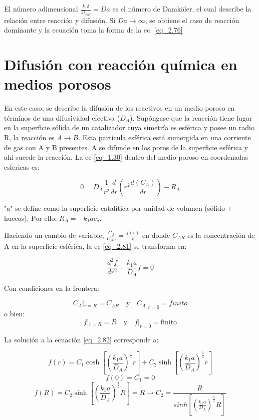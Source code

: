 El número adimensional $\frac{k_1\delta}{\mathscr{D}_{AB}}=Da$ es el número de Damköler, el cual describe la relación entre reacción y difusión. Si $Da\rightarrow\infty$, se obtiene el caso de reacción dominante y la ecuación toma la forma de la ec. \eqref{eq_2.76}

\section{Difusión con reacción química en medios porosos}

En este caso, se describe la difusión de los reactivos en un medio poroso en términos de una difusividad efectiva ($D_A$). Supóngase que la reacción tiene lugar en la superficie sólida de un catalizador cuya simetría es esférica y posee un radio R, la reacción es $A\rightarrow B$. Esta partícula esférica está sumergida en una corriente de gas con A y B presentes. A se difunde en los poros de la superficie esférica y ahí sucede la reacción. La ec \eqref{eq_1.30} dentro del medio poroso en coordenadas esfericas es:

\begin{equation}
    0=D_A\frac{1}{r^2}\frac{d}{dr}(r^2\frac{d(C_A)}{dr})-R_A
    \label{eq_2.81}
\end{equation}

"a" se define como la superficie catalítica por unidad de volumen (sólido + huecos). Por ello, $R_A=-k_1ac_a$.

Haciendo un cambio de variable, $\frac{C_A}{C_{AR}}=\frac{f(r)}{r}$ en donde $C_{AR}$ es la concentración de A en la superficie esférica, la ec \eqref{eq_2.81} se transforma en:

\begin{equation}
    \frac{d^2f}{dr^2}-\frac{k_1a}{D_A}f=0
    \label{eq_2.82}
\end{equation}

Con condiciones en la frontera:

\begin{equation}
    C_A|_{r=R}=C_{AR} \quad \text{y} \quad C_A|_{r=0}=finito
\end{equation}
o bien:
\begin{equation*}
    f|_{r=R}=R\quad \text{y} \quad
    f|_{r=0}=\text{finito}
\end{equation*}

La solución a la ecuación \eqref{eq_2.82} corresponde a:

\begin{equation}
    f(r)=C_1\cosh[(\frac{k_1a}{D_A})^\frac{1}{2}r]+C_2\sinh[(\frac{k_1a}{D_A})^\frac{1}{2}r]
\end{equation}
\begin{equation*}
    f(0)=C_1=0
\end{equation*}
\begin{equation*}
    f(R)=C_2\sinh[(\frac{k_1a}{D_A})^\frac{1}{2}R]=R\longrightarrow C_2=\frac{R}{sinh[(\frac{k_1a}{D_A})^\frac{1}{2}R]}
\end{equation*}

